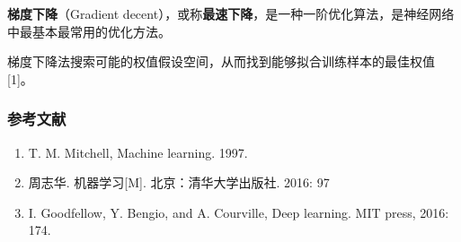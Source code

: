 
\textbf{梯度下降}（Gradient decent），或称\textbf{最速下降}，是一种一阶优化算法，是神经网络中最基本最常用的优化方法。

梯度下降法搜索可能的权值假设空间，从而找到能够拟合训练样本的最佳权值 [1]。




\subsubsection{参考文献}
\begin{enumerate}
\item T. M. Mitchell, Machine learning. 1997.
\item 周志华. 机器学习[M]. 北京：清华大学出版社. 2016: 97
\item I. Goodfellow, Y. Bengio, and A. Courville, Deep learning. MIT press, 2016: 174.
\end{enumerate}